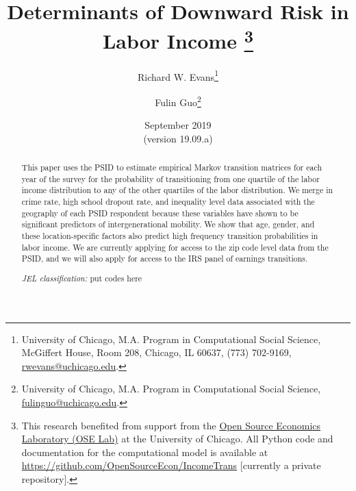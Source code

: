 \documentclass[letterpaper,12pt]{article}
\theoremstyle{definition}
\begin{document}
\begin{titlepage}
\title{
  Determinants of Downward Risk in Labor Income \thanks{This research benefited from support from the \href{https://www.oselab.org}{Open Source Economics Laboratory (OSE Lab)} at the University of Chicago. All Python code and documentation for the computational model is available at \href{https://github.com/OpenSourceEcon/IncomeTrans}{https://github.com/OpenSourceEcon/IncomeTrans} [currently a private repository].}
}
\author{
  Richard W. Evans\footnote{University of Chicago, M.A. Program in Computational Social Science, McGiffert House, Room 208, Chicago, IL 60637, (773) 702-9169, \href{mailto:rwevans@uchicago.edu}{rwevans@uchicago.edu}.}
  \and
  Fulin Guo\footnote{University of Chicago, M.A. Program in Computational Social Science, \href{mailto:fulinguo@uchicago.edu}{fulinguo@uchicago.edu}.}}
\date{September 2019 \\
  \scriptsize{(version 19.09.a)}}
\maketitle
\vspace{-9mm}
\begin{abstract}
\small{This paper uses the PSID to estimate empirical Markov transition matrices for each year of the survey for the probability of transitioning from one quartile of the labor income distribution to any of the other quartiles of the labor distribution. We merge in crime rate, high school dropout rate, and inequality level data associated with the geography of each PSID respondent because these variables have shown to be significant predictors of intergenerational mobility. We show that age, gender, and these location-specific factors also predict high frequency transition probabilities in labor income. We are currently applying for access to the zip code level data from the PSID, and we will also apply for access to the IRS panel of earnings transitions.
\vspace{3mm}

%
%
\noindent\textit{JEL classification:} put codes here
}

\end{abstract}
\thispagestyle{empty}
\end{titlepage}
\end{document}
